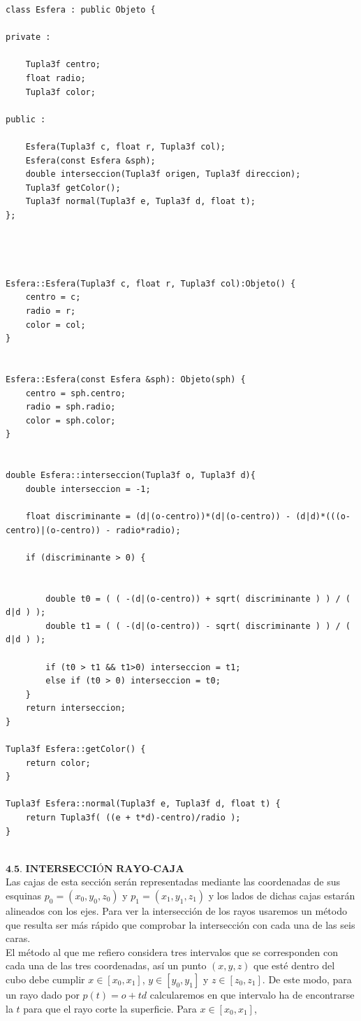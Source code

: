 \begin{lstlisting}[style=Consola]
class Esfera : public Objeto {

private :

	Tupla3f centro;
	float radio;
	Tupla3f color;

public :

	Esfera(Tupla3f c, float r, Tupla3f col);
	Esfera(const Esfera &sph);
	double interseccion(Tupla3f origen, Tupla3f direccion);
	Tupla3f getColor();
	Tupla3f normal(Tupla3f e, Tupla3f d, float t);
};




Esfera::Esfera(Tupla3f c, float r, Tupla3f col):Objeto() {
	centro = c;
	radio = r;
	color = col;
}


Esfera::Esfera(const Esfera &sph): Objeto(sph) {
	centro = sph.centro;
	radio = sph.radio;
	color = sph.color;
}


double Esfera::interseccion(Tupla3f o, Tupla3f d){
	double interseccion = -1;

	float discriminante = (d|(o-centro))*(d|(o-centro)) - (d|d)*(((o-centro)|(o-centro)) - radio*radio);

	if (discriminante > 0) {


		double t0 = ( ( -(d|(o-centro)) + sqrt( discriminante ) ) / ( d|d ) );
		double t1 = ( ( -(d|(o-centro)) - sqrt( discriminante ) ) / ( d|d ) );

		if (t0 > t1 && t1>0) interseccion = t1;
		else if (t0 > 0) interseccion = t0;
	}
	return interseccion;
}

Tupla3f Esfera::getColor() {
	return color;
}

Tupla3f Esfera::normal(Tupla3f e, Tupla3f d, float t) {
	return Tupla3f( ((e + t*d)-centro)/radio );
}
\end{lstlisting}

${ }$\\
$\textbf{4.5. INTERSECCIÓN RAYO-CAJA}$
${ }$\\

Las cajas de esta sección serán representadas mediante las coordenadas de sus esquinas $p_0 = (x_0, y_0, z_0)$ y $p_1 = (x_1, y_1, z_1)$ y los lados de dichas cajas estarán alineados con los ejes. Para ver la intersección de los rayos usaremos un método que resulta ser más rápido que comprobar la intersección con cada una de las seis caras.
	${ }$\\	
	
El método al que me refiero considera tres intervalos que se corresponden con cada una de las tres coordenadas, así un punto $(x, y, z)$ que esté dentro del cubo debe cumplir $x \in [x_0, x_1]$, $y \in [y_0, y_1]$ y $z \in [z_0, z_1]$. De este modo, para un rayo dado por $p(t) = o + td$ calcularemos en que intervalo ha de encontrarse la $t$ para que el rayo corte la superficie. Para $x \in [x_0, x_1]$,

